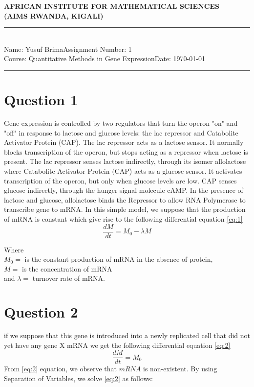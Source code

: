 \documentclass[12pt,a4paper]{article}
\newcommand{\student}{Yusuf Brima}
\newcommand{\course}{Quantitative Methods in Gene Expression}
\newcommand{\assignment}{1}
\begin{document}
\thispagestyle{empty}
\begin{center}
\textbf{AFRICAN INSTITUTE FOR MATHEMATICAL SCIENCES \\[0.5cm]
(AIMS RWANDA, KIGALI)}
\vspace{1.0cm}
\end{center}

\noindent
\rule{17cm}{0.2cm}\\[0.3cm]
Name: \student \hfill Assignment Number: \assignment\\[0.1cm]
Course: \course \hfill Date: \today\\
\rule{17cm}{0.05cm}
\vspace{1.0cm}

\section*{Question 1}
 Gene expression is controlled by two regulators  that turn the operon "on" and "off" in response to lactose and glucose levels: the lac repressor and Catabolite Activator Protein (CAP). The lac repressor acts as a lactose sensor. It normally blocks transcription of the operon, but stops acting as a repressor when lactose is present. The lac repressor senses lactose indirectly, through its isomer allolactose where Catabolite Activator Protein (CAP) acts as a glucose sensor.  It activates transcription of the operon, but only when glucose levels are low. CAP senses glucose indirectly,  through the hunger signal molecule cAMP.  In the presence of lactose and glucose, allolactose binds the Repressor to allow RNA Polymerase to transcribe gene to mRNA.
In this simple model,  we suppose that the production of mRNA is constant which give rise to the following differential equation \eqref{eq:1}
\begin{equation}
\frac{dM}{dt} = M_0 - \lambda M 
\label{eq:1}
\end{equation}

Where \\
$ M_0=  $  is the constant production of mRNA in the absence of protein,\\
$ M=  $  is the concentration of mRNA\\
and $ \lambda = $ turnover rate of mRNA.
\section*{Question 2 }
if we suppose that this gene is introduced into a newly replicated cell  that did not yet have any gene X mRNA we get the following differential equation \eqref{eq:2}
\begin{equation}
\frac{dM}{dt} = M_0
\label{eq:2}
\end{equation}
From \eqref{eq:2} equation,  we observe that $mRNA$ is non-existent.   By using Separation of Variables, we solve \eqref{eq:2} as follows:
\end{document}
